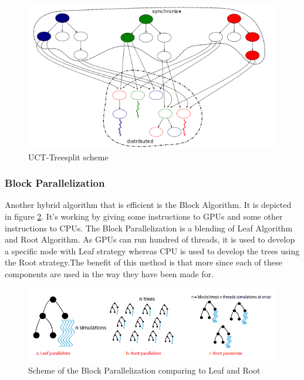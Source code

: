 \begin{figure}[!h] 
\centerline{\includegraphics[scale=0.60]{2_State_of_the_art/Strategy_of_root_parallelization_Mikail/treesplit.png}}
   \caption{\label{étiquette} UCT-Treesplit scheme}
\label{treesplit}
\end{figure}

\subsubsection{Block Parallelization}

Another hybrid algorithm that is efficient is the Block Algorithm\cite{GPU}.  It is depicted in figure \ref{block}. It's working by giving some instructions to GPUs and some other instructions to CPUs. The Block Parallelization is a blending of Leaf Algorithm and Root Algorithm. As GPUs can run hundred of threads, it is used to develop a specific node with Leaf strategy whereas CPU is used to develop the trees using the Root strategy.The benefit of this method is that more since each of these components are used in the way they have been made for.

\begin{figure}[!h] 
\centerline{\includegraphics[scale=0.60]{2_State_of_the_art/Strategy_of_root_parallelization_Mikail/block.png}}
   \caption{\label{étiquette} Scheme of the Block Parallelization comparing to Leaf and Root}
\label{block}
\end{figure}

